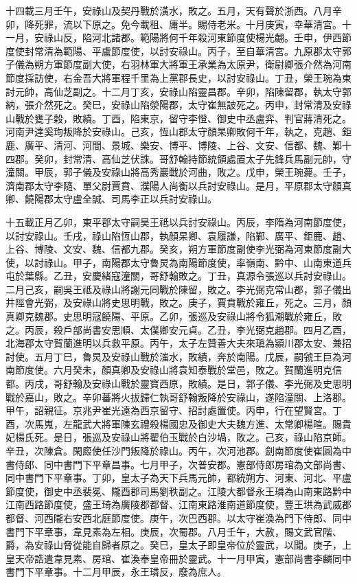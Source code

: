 \begin{pinyinscope}
 十四載三月壬午，安祿山及契丹戰於潢水，敗之。五月，天有聲於浙西。八月辛卯，降死罪，流以下原之。免今載租、庸半。賜侍老米。十月庚寅，幸華清宮。十一月，安祿山反，陷河北諸郡。範陽將何千年殺河東節度使楊光翽。壬申，伊西節度使封常清為範陽、平盧節度使，以討安祿山。丙子，至自華清宮。九原郡太守郭子儀為朔方軍節度副大使，右羽林軍大將軍王承業為太原尹，衛尉卿張介然為河南節度採訪使，右金吾大將軍程千里為上黨郡長史，以討安祿山。丁丑，榮王琬為東討元帥，高仙芝副之。十二月丁亥，安祿山陷靈昌郡。辛卯，陷陳留郡，執太守郭納，張介然死之。癸巳，安祿山陷滎陽郡，太守崔無詖死之。丙申，封常清及安祿山戰於甕子穀，敗績。丁酉，陷東京，留守李憕、御史中丞盧弈、判官蔣清死之。河南尹達奚珣叛降於安祿山。己亥，恆山郡太守顏杲卿敗何千年，執之，克趙、鉅鹿、廣平、清河、河間、景城、樂安、博平、博陵、上谷、文安、信都、魏、鄴十四郡。癸卯，封常清、高仙芝伏誅。哥舒翰持節統領處置太子先鋒兵馬副元帥，守潼關。甲辰，郭子儀及安祿山將高秀巖戰於河曲，敗之。戊申，榮王琬薨。壬子，濟南郡太守李隨、單父尉賈賁、濮陽人尚衡以兵討安祿山。是月，平原郡太守顏真卿、饒陽郡太守盧全誠、司馬李正以兵討安祿山。



 十五載正月乙卯，東平郡太守嗣昊王祗以兵討安祿山。丙辰，李隋為河南節度使，以討安祿山。壬戌，祿山陷恆山郡，執顏杲卿、袁履謙，陷鄴、廣平、鉅鹿、趙、上谷、博陵、文安、魏、信都九郡。癸亥，朔方軍節度副使李光弼為河東節度副大使，以討祿山。甲子，南陽郡太守魯炅為南陽節度使，率嶺南、黔中、山南東道兵屯於葉縣。乙丑，安慶緒寇潼關，哥舒翰敗之。丁丑，真源令張巡以兵討安祿山。二月己亥，嗣吳王祗及祿山將謝元同戰於陳留，敗之。李光弼克常山郡，郭子儀出井陘會光弼，及安祿山將史思明戰，敗之。庚子，賈賁戰於雍丘，死之。三月，顏真卿克魏郡。史思明寇饒陽、平原。乙卯，張巡及安祿山將令狐潮戰於雍丘，敗之。丙辰，殺戶部尚書安思順、太僕卿安元貞。乙丑，李光弼克趙郡。四月乙酉，北海郡太守賀蘭進明以兵救平原。丙午，太子左贊善大夫來瑱為潁川郡太安、兼招討使。五月丁巳，魯炅及安祿山戰於滍水，敗績，奔於南陽。戊辰，嗣虢王巨為河南節度使。六月癸未，顏真卿及安祿山將袁知泰戰於堂邑，敗之。賀蘭進明克信都。丙戌，哥舒翰及安祿山戰於靈寶西原，敗績。是日，郭子儀、李光弼及史思明戰於嘉山，敗之。辛卯蕃將火拔歸仁執哥舒翰叛降於安祿山，遂陷潼關、上洛郡。甲午，詔親征。京兆尹崔光遠為西京留守、招討處置使。丙申，行在望賢宮。丁酉，次馬嵬，左龍武大將軍陳玄禮殺楊國忠及御史大夫魏方進、太常卿楊暄。賜貴妃楊氏死。是日，張巡及安祿山將翟伯玉戰於白沙堝，敗之。己亥，祿山陷京師。辛丑，次陳倉。閑廄使任沙門叛降於祿山。丙午，次河池郡。劍南節度使崔圓為中書侍郎、同中書門下平章昌事。七月甲子，次普安郡。憲部侍郎房琯為文部尚書、同中書門下平章事。丁卯，皇太子為天下兵馬元帥，都統朔方、河東、河北、平盧節度使，御史中丞裴冕、隴酉郡司馬劉秩副之。江陵大都督永王璘為山南東路黔中江南西路節度使，盛王琦為廣陵郡都督、江南東路淮南道節度使，豐王珙為武威郡都督、河西隴右安西北庭節度使。庚午，次巴西郡。以太守崔渙為門下侍郎、同中書門下平章事，韋見素為左相。庚辰，次蜀郡。八月壬午，大赦，賜文武官階、爵，為安祿山脅從能自歸者原之。癸巳，皇太子即皇帝位於靈武，以聞。庚子，上皇天帝誥遣韋見素、房琯、崔渙奉皇帝冊於靈武。十一月甲寅，憲部尚書李麟同中書門下平章事。十二月甲辰，永王璘反，廢為庶人。




\end{pinyinscope}
